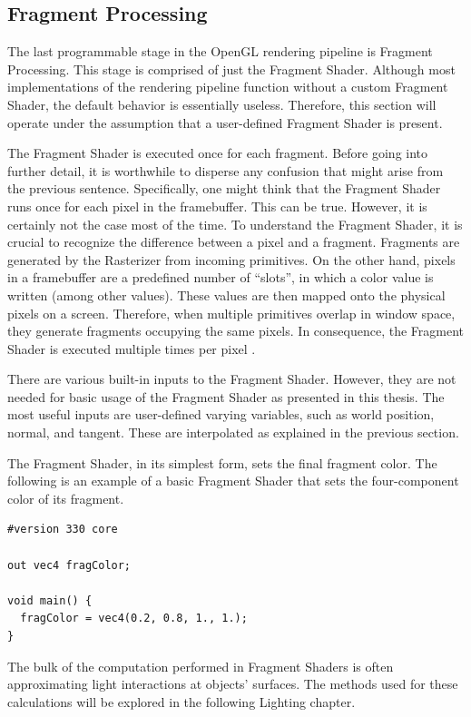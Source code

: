 \documentclass[
  digital,     %
  oneside,     %
  nosansbold,  %
  nocolorbold, %
  lof,         %
  lot,         %
]{fithesis4}
\begin{document}
\subsection{Fragment Processing}
The last programmable stage in the OpenGL rendering pipeline is Fragment Processing.
This stage is comprised of just the Fragment Shader. Although most implementations of the rendering pipeline function
without a custom Fragment Shader, the default behavior is essentially useless. Therefore, this section will
operate under the assumption that a user-defined Fragment Shader is present.

The Fragment Shader is executed once for each fragment. Before going into further detail, it is worthwhile
to disperse any confusion that might arise from the previous sentence. Specifically, one might think
that the Fragment Shader runs once for each pixel in the framebuffer. This can be true. However, it is certainly
not the case most of the time. To understand the Fragment Shader, it is crucial to recognize the difference
between a pixel and a fragment. Fragments are generated by the Rasterizer from incoming primitives. On the other hand,
pixels in a framebuffer are a predefined number of \enquote{slots}, in which a color value is written (among other values).
These values are then mapped onto the physical pixels on a screen. Therefore, when multiple primitives overlap
in window space, they generate fragments occupying the same pixels. In consequence,
the Fragment Shader is executed multiple times per pixel \cite{openglwiki-fragment}.

There are various built-in inputs to the Fragment Shader. However, they are not needed for basic usage of the
Fragment Shader as presented in this thesis. The most useful inputs are user-defined varying variables,
such as world position, normal, and tangent. These are interpolated as explained in the previous section.

The Fragment Shader, in its simplest form, sets the final fragment color. The following is an example
of a basic Fragment Shader that sets the four-component color of its fragment.
\begin{verbatim}
#version 330 core

out vec4 fragColor;

void main() {
  fragColor = vec4(0.2, 0.8, 1., 1.);
}
\end{verbatim}

The bulk of the computation performed in Fragment Shaders is often approximating light interactions at objects' surfaces.
The methods used for these calculations will be explored in the following Lighting chapter.
\end{document}

